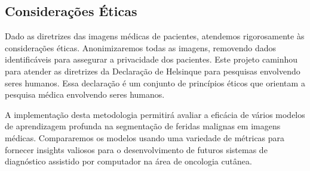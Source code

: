 \subsection{Considerações Éticas}

    Dado as diretrizes das imagens médicas de pacientes, atendemos rigorosamente às considerações éticas. Anonimizaremos todas as imagens, removendo dados identificáveis para assegurar a privacidade dos pacientes. Este projeto caminhou para atender as diretrizes da Declaração de Helsinque para pesquisas envolvendo seres humanos. Essa declaração é um conjunto de princípios éticos que orientam a pesquisa médica envolvendo seres humanos.
    
    A implementação desta metodologia permitirá avaliar a eficácia de vários modelos de aprendizagem profunda na segmentação de feridas malignas em imagens médicas. Compararemos os modelos usando uma variedade de métricas para fornecer insights valiosos para o desenvolvimento de futuros sistemas de diagnóstico assistido por computador na área de oncologia cutânea.

